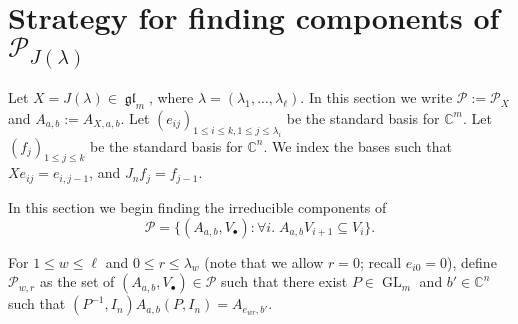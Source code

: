 \documentclass[12pt,psamsfonts]{article}
\DeclareMathOperator{\GL}{GL}
\DeclareMathOperator{\gl}{\mathfrak{gl}}
\begin{document}
\section{Strategy for finding components of \texorpdfstring{\(\mathcal{P}_{J(\lambda)}\)}{P\_\{J(\textbackslash lambda)\}}}\label{p_comp_strat}
\par Let \(X = J(\lambda) \in \gl_m\), where \(\lambda = (\lambda_1, ..., \lambda_\ell)\).
In this section we write \(\mathcal{P} := \mathcal{P}_X\) and \(A_{a, b} := A_{X, a, b}\).
Let \((e_{ij})_{1 \leq i \leq k, 1 \leq j \leq \lambda_i}\) be the standard basis for \(\mathbb{C}^m\).
Let \((f_j)_{1 \leq j \leq k}\) be the standard basis for \(\mathbb{C}^n\).
We index the bases such that \(Xe_{ij} = e_{i,j - 1}\), and \(J_n f_j = f_{j - 1}\).
\par In this section we begin finding the irreducible components of
\[\mathcal{P} = \{(A_{a, b}, V_\bullet) : \forall i. \; A_{a, b} V_{i + 1} \subseteq V_i\}.\]
\par For \(1 \leq w \leq \ell\) and \(0 \leq r \leq \lambda_w\) (note that we allow \(r = 0\); recall \(e_{i0} = 0\)), define \(\mathcal{P}_{w,r}\) as the set of \((A_{a,b}, V_\bullet) \in \mathcal{P}\) such that there exist \(P \in \GL_m\) and \(b' \in \mathbb{C}^n\) such that \((P^{-1}, I_n) A_{a, b} (P, I_n) = A_{e_{wr}, b'}\).
\end{document}

